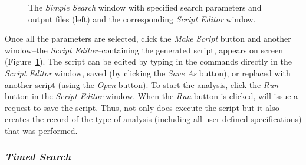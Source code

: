 \begin{figure}
\begin{minipage}[c]{0.52\textwidth}
   	\end{minipage}
	
    \caption{The \emph{Simple Search} window with specified search parameters and output files (left) and the corresponding \emph{Script Editor} window.}
    \label{fig:ScriptEditor_Window}
\end{figure}

Once all the parameters are selected, click the \emph{Make Script} button and another
window--the \emph{Script Editor}--containing the generated script, appears on screen (Figure~\ref{fig:ScriptEditor_Window}). 
The script can be edited by typing in the commands directly in the \emph{Script Editor} window,
 saved (by clicking the \emph{Save As} button), or replaced with another script (using 
 the \emph{Open} button). To start the analysis, click the \emph{Run} button in the 
 \emph{Script Editor} window. When the \emph{Run} button is clicked, \poy will issue a
 request to save the script. Thus, not only does \poy execute the script but
 it also creates the record of the type of analysis (including all user-defined specifications) that was performed.
 
\subsubsection*{\emph{Timed Search}}

